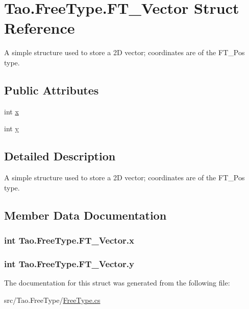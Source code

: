 \hypertarget{struct_tao_1_1_free_type_1_1_f_t___vector}{
\section{Tao.FreeType.FT\_\-Vector Struct Reference}
\label{struct_tao_1_1_free_type_1_1_f_t___vector}
}


A simple structure used to store a 2D vector; coordinates are of the FT\_\-Pos type.  


\subsection*{Public Attributes}
\begin{DoxyCompactItemize}
\item 
int \hyperlink{struct_tao_1_1_free_type_1_1_f_t___vector_a2e160ac7da5d0a9cb3363164775c4cd7}{x}
\item 
int \hyperlink{struct_tao_1_1_free_type_1_1_f_t___vector_aefa1227287088073fc6869f55d15a405}{y}
\end{DoxyCompactItemize}


\subsection{Detailed Description}
A simple structure used to store a 2D vector; coordinates are of the FT\_\-Pos type. 

\subsection{Member Data Documentation}
\hypertarget{struct_tao_1_1_free_type_1_1_f_t___vector_a2e160ac7da5d0a9cb3363164775c4cd7}{
\subsubsection[{x}]{\setlength{\rightskip}{0pt plus 5cm}int {\bf Tao.FreeType.FT\_\-Vector.x}}}
\label{struct_tao_1_1_free_type_1_1_f_t___vector_a2e160ac7da5d0a9cb3363164775c4cd7}
\hypertarget{struct_tao_1_1_free_type_1_1_f_t___vector_aefa1227287088073fc6869f55d15a405}{
\subsubsection[{y}]{\setlength{\rightskip}{0pt plus 5cm}int {\bf Tao.FreeType.FT\_\-Vector.y}}}
\label{struct_tao_1_1_free_type_1_1_f_t___vector_aefa1227287088073fc6869f55d15a405}


The documentation for this struct was generated from the following file:\begin{DoxyCompactItemize}
\item 
src/Tao.FreeType/\hyperlink{_free_type_8cs}{FreeType.cs}\end{DoxyCompactItemize}
